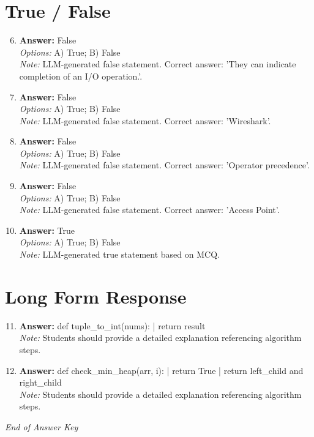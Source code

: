 \documentclass[12pt]{article}
\begin{document}
\section*{True / False}
\begin{enumerate}[label=\arabic*.]
\setcounter{enumi}{5}
\item \textbf{Answer:} False
\\ \textit{Options:} A) True; B) False
\\ \textit{Note:} LLM-generated false statement. Correct answer: 'They can indicate completion of an I/O operation.'.
\item \textbf{Answer:} False
\\ \textit{Options:} A) True; B) False
\\ \textit{Note:} LLM-generated false statement. Correct answer: 'Wireshark'.
\item \textbf{Answer:} False
\\ \textit{Options:} A) True; B) False
\\ \textit{Note:} LLM-generated false statement. Correct answer: 'Operator precedence'.
\item \textbf{Answer:} False
\\ \textit{Options:} A) True; B) False
\\ \textit{Note:} LLM-generated false statement. Correct answer: 'Access Point'.
\item \textbf{Answer:} True
\\ \textit{Options:} A) True; B) False
\\ \textit{Note:} LLM-generated true statement based on MCQ.
\end{enumerate}

\section*{Long Form Response}
\begin{enumerate}[label=\arabic*.]
\setcounter{enumi}{10}
\item \textbf{Answer:} def tuple\_to\_int(nums): | return result
\\ \textit{Note:} Students should provide a detailed explanation referencing algorithm steps.
\item \textbf{Answer:} def check\_min\_heap(arr, i): | return True | return left\_child and right\_child
\\ \textit{Note:} Students should provide a detailed explanation referencing algorithm steps.
\end{enumerate}

\vfill
\noindent\textit{End of Answer Key}
\end{document}
